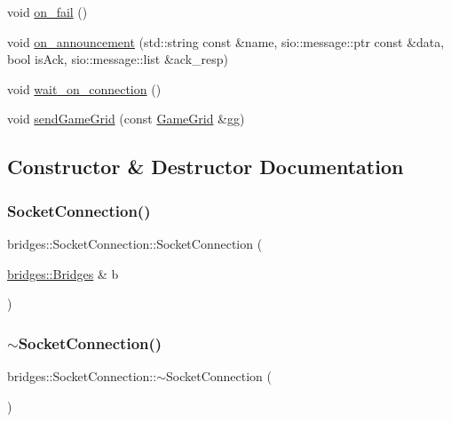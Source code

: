 \begin{DoxyCompactItemize}
\item 
void \mbox{\hyperlink{classbridges_1_1_socket_connection_abd5e1625888e54871d9c605c5f81c98c}{on\+\_\+fail}} ()
\item 
void \mbox{\hyperlink{classbridges_1_1_socket_connection_a50b2ed74fe45e3ea9bf5141c01837f7c}{on\+\_\+announcement}} (std\+::string const \&name, sio\+::message\+::ptr const \&data, bool is\+Ack, sio\+::message\+::list \&ack\+\_\+resp)
\item 
void \mbox{\hyperlink{classbridges_1_1_socket_connection_a17902452eaf3c292be57573a507d43cc}{wait\+\_\+on\+\_\+connection}} ()
\item 
void \mbox{\hyperlink{classbridges_1_1_socket_connection_af947b550051476f3e92b550103a42c44}{send\+Game\+Grid}} (const \mbox{\hyperlink{classbridges_1_1_game_grid}{Game\+Grid}} \&gg)
\end{DoxyCompactItemize}


\subsection{Constructor \& Destructor Documentation}
\mbox{\label{classbridges_1_1_socket_connection_af8d4af3664ff3d4a2ca52aec5138b05b}} 
\subsubsection{\texorpdfstring{SocketConnection()}{SocketConnection()}}
{\footnotesize\ttfamily bridges\+::\+Socket\+Connection\+::\+Socket\+Connection (\begin{DoxyParamCaption}\item[{\mbox{\hyperlink{classbridges_1_1_bridges}{bridges\+::\+Bridges}} \&}]{b }\end{DoxyParamCaption})\hspace{0.3cm}{\ttfamily [inline]}}

\mbox{\label{classbridges_1_1_socket_connection_aa5810b0c978315c18722e53f33622dfd}} 
\subsubsection{\texorpdfstring{$\sim$SocketConnection()}{~SocketConnection()}}
{\footnotesize\ttfamily bridges\+::\+Socket\+Connection\+::$\sim$\+Socket\+Connection (\begin{DoxyParamCaption}{ }\end{DoxyParamCaption})\hspace{0.3cm}{\ttfamily [inline]}}




